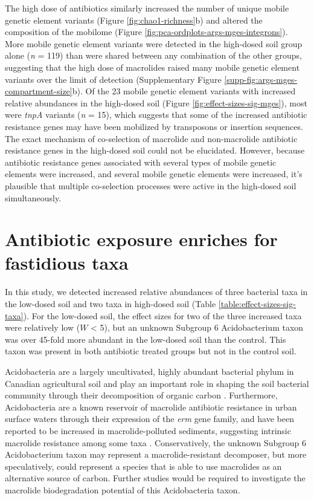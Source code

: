 The high dose of antibiotics similarly increased the number of unique mobile genetic element variants (Figure \ref{fig:chao1-richness}b) and altered the composition of the mobilome (Figure \ref{fig:pca-ordplots-args-mges-integrons}).
More mobile genetic element variants were detected in the high-dosed soil group alone (\textit{n} = 119) than were shared between any combination of the other groups, suggesting that the high dose of macrolides raised many mobile genetic element variants over the limit of detection (Supplementary Figure \ref{supp-fig:args-mges-compartment-size}b).
Of the 23 mobile genetic element variants with increased relative abundances in the high-dosed soil (Figure \ref{fig:effect-sizes-sig-mges}), most were \textit{tnpA} variants (\textit{n} = 15), which suggests that some of the increased antibiotic resistance genes may have been mobilized by transposons or insertion sequences.
The exact mechanism of co-selection of macrolide and non-macrolide antibiotic resistance genes in the high-dosed soil could not be elucidated.
However, because antibiotic resistance genes associated with several types of mobile genetic elements were increased, and several mobile genetic elements were increased, it's plausible that multiple co-selection processes were active in the high-dosed soil simultaneously.

\section{Antibiotic exposure enriches for fastidious taxa}

In this study, we detected increased relative abundances of three bacterial taxa in the low-dosed soil and two taxa in high-dosed soil (Table \ref{table:effect-sizes-sig-taxa}).
For the low-dosed soil, the effect sizes for two of the three increased taxa were relatively low ($W$ < 5), but an unknown Subgroup 6 Acidobacterium taxon was over 45-fold more abundant in the low-dosed soil than the control.
This taxon was present in both antibiotic treated groups but not in the control soil.


Acidobacteria are a largely uncultivated, highly abundant bacterial phylum in Canadian agricultural soil and play an important role in shaping the soil bacterial community through their decomposition of organic carbon \parencite{Solden.2016, Banerjee.2016, Banerjee.2016b}.
Furthermore, Acidobacteria are a known reservoir of macrolide antibiotic resistance in urban surface waters through their expression of the \textit{erm} gene family, and have been reported to be increased in macrolide-polluted sediments, suggesting intrinsic macrolide resistance among some taxa \parencite{Yi.2019, Milakovic.2020}.
Conservatively, the unknown Subgroup 6 Acidobacterium taxon may represent a macrolide-resistant decomposer, but more speculatively, could represent a species that is able to use macrolides as an alternative source of carbon.
Further studies would be required to investigate the macrolide biodegradation potential of this Acidobacteria taxon.

